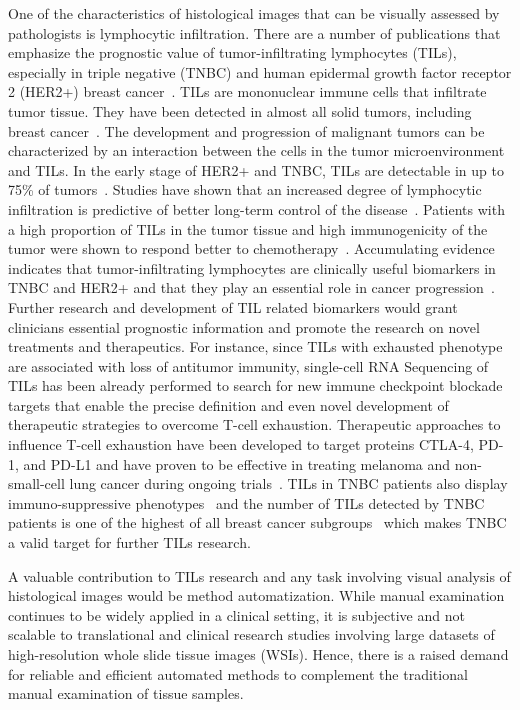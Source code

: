 One of the characteristics of histological images that can be visually assessed by pathologists is lymphocytic infiltration.
There are a number of publications that emphasize the prognostic value of tumor-infiltrating lymphocytes (TILs),
especially in triple negative (TNBC) and human epidermal growth factor receptor 2 (HER2+) breast cancer~\cite*{salgado2015evaluation, denkert2018tumour}.
TILs are mononuclear immune cells that infiltrate tumor tissue.
They have been detected in almost all solid tumors, including breast cancer~\cite{laenkholm2022incorporation}.
The development and progression of malignant tumors can be characterized by an interaction between the cells
in the tumor microenvironment and TILs.
In the early stage of HER2+ and TNBC, TILs are detectable in up to 75\% of tumors~\cite{dieci2018update}.
Studies have shown that an increased degree of lymphocytic infiltration is predictive of better
long-term control of the disease~\cite{adams2014prognostic, loi2013prognostic}.
Patients with a high proportion of TILs in the tumor tissue and high immunogenicity of the tumor were shown
to respond better to chemotherapy~\cite{denkert2010tumor}.
Accumulating evidence indicates that tumor-infiltrating lymphocytes are clinically useful biomarkers
in TNBC and HER2+ and that they play an essential role in cancer progression~\cite{gao2020prognostic}.
Further research and development of TIL related biomarkers would grant clinicians
essential prognostic information and promote the research on novel treatments and therapeutics.
For instance, since TILs with exhausted phenotype are associated with loss of antitumor immunity,
single-cell RNA Sequencing of TILs has been already performed to search for new immune checkpoint blockade
targets that enable the precise definition and even novel development of therapeutic strategies to overcome T-cell exhaustion.
Therapeutic approaches to influence T-cell exhaustion have been developed to target proteins CTLA-4,
PD-1, and PD-L1 and have proven to be effective in treating melanoma and non-small-cell lung cancer
during ongoing trials~\cite{postow2015immune}.
TILs in TNBC patients also display immuno-suppressive phenotypes~\cite{chung2017single} and the number
of TILs detected by TNBC patients is one of the highest of all breast cancer subgroups~\cite{schneeweiss2019diagnosis}
which makes TNBC a valid target for further TILs research.

A valuable contribution to TILs research and any task involving visual analysis
of histological images would be method automatization.
While manual examination continues to be widely applied in a clinical setting,
it is subjective and not scalable to translational and clinical research studies
involving large datasets of high-resolution whole slide tissue images (WSIs).
Hence, there is a raised demand for reliable and efficient automated methods to
complement the traditional manual examination of tissue samples. 

